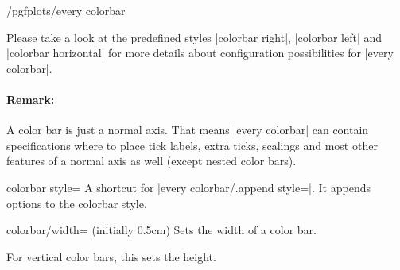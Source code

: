 \begin{stylekey}{/pgfplots/every colorbar}
\begin{codeexample}[]
\end{codeexample}

\begin{codeexample}[]
\end{codeexample}
	Please take a look at the predefined styles |colorbar right|, |colorbar left| and |colorbar horizontal| for more details about configuration possibilities for |every colorbar|.

	\paragraph{Remark:} A color bar is just a normal axis. That means |every colorbar| can contain specifications where to place tick labels, extra ticks, scalings and most other features of a normal axis as well (except nested color bars).
\end{stylekey}

\begin{pgfplotskey}{colorbar style=}
	A shortcut for |every colorbar/.append style=|. It appends options to the colorbar style.
\end{pgfplotskey}

\begin{pgfplotskey}{colorbar/width= (initially 0.5cm)}
	Sets the width of a color bar.
\pgfplotsexpensiveexample
\begin{codeexample}[]
\end{codeexample}

	For vertical color bars, this sets the height.
\end{pgfplotskey}


